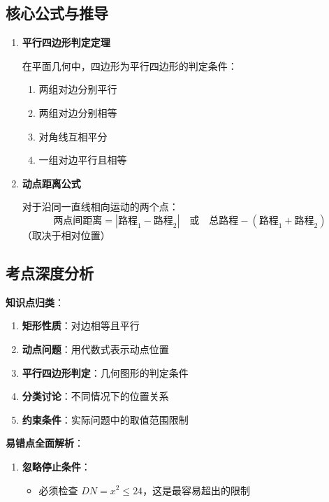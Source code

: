 \documentclass[UTF8]{ctexart}
\newenvironment{redenv}{\color{red}}{}
\newenvironment{conceptbox}{%
    \begin{tcolorbox}[colback=red!5, colframe=red!50!black, title=概念解析, fonttitle=\bfseries]
}{%
    \end{tcolorbox}
}
\newenvironment{formuladerivation}{%
    \begin{enumerate}[label={\textbf{公式\arabic*：}}, leftmargin=*, align=left]
}{%
    \end{enumerate}
}
\begin{document}
\begin{redenv}
\subsection*{核心公式与推导}

\begin{formuladerivation}
\item \textbf{平行四边形判定定理}

在平面几何中，四边形为平行四边形的判定条件：
\begin{enumerate}
    \item 两组对边分别平行
    \item 两组对边分别相等
    \item 对角线互相平分
    \item 一组对边平行且相等
\end{enumerate}

\item \textbf{动点距离公式}

对于沿同一直线相向运动的两个点：
\[
\text{两点间距离} = |\text{路程}_1 - \text{路程}_2| \quad \text{或} \quad \text{总路程} - (\text{路程}_1 + \text{路程}_2)
\]
（取决于相对位置）
\end{formuladerivation}

\subsection*{考点深度分析}

\begin{conceptbox}
\textbf{知识点归类}：
\begin{enumerate}
    \item \textbf{矩形性质}：对边相等且平行
    \item \textbf{动点问题}：用代数式表示动点位置
    \item \textbf{平行四边形判定}：几何图形的判定条件
    \item \textbf{分类讨论}：不同情况下的位置关系
    \item \textbf{约束条件}：实际问题中的取值范围限制
\end{enumerate}
\end{conceptbox}

\noindent\textbf{易错点全面解析}：
\begin{enumerate}[label=\arabic*.]
    \item \textbf{忽略停止条件}：
    \begin{itemize}
        \item 必须检查 $DN = x^2 \leq 24$，这是最容易超出的限制
    \end{itemize}
    

\end{enumerate}
\end{redenv}
\end{document}
